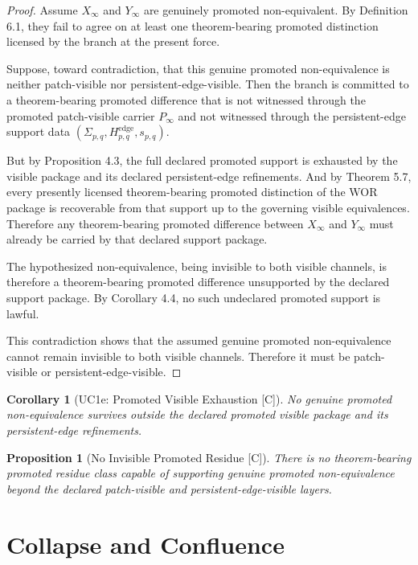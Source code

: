 \documentclass[11pt]{article}
\newtheorem{proposition}[theorem]{Proposition}
\newtheorem{corollary}[theorem]{Corollary}
\theoremstyle{definition}
\theoremstyle{remark}
\newcommand{\C}{\textnormal{[C]}}
\newcommand{\Pinf}{P_\infty}
\newcommand{\Xinf}{X_\infty}
\newcommand{\Sigmaedge}{\Sigma_{p,q}}
\newcommand{\Hedge}{H^{\mathrm{edge}}_{p,q}}
\newcommand{\scopepq}{s_{p,q}}
\begin{document}
\begin{proof}
Assume \(\Xinf\) and \(Y_\infty\) are genuinely promoted non-equivalent. By Definition 6.1, they fail to agree on at least one theorem-bearing promoted distinction licensed by the branch at the present force.

Suppose, toward contradiction, that this genuine promoted non-equivalence is neither patch-visible nor persistent-edge-visible. Then the branch is committed to a theorem-bearing promoted difference that is not witnessed through the promoted patch-visible carrier \(\Pinf\) and not witnessed through the persistent-edge support data \((\Sigmaedge,\Hedge,\scopepq)\).

But by Proposition 4.3, the full declared promoted support is exhausted by the visible package and its declared persistent-edge refinements. And by Theorem 5.7, every presently licensed theorem-bearing promoted distinction of the WOR package is recoverable from that support up to the governing visible equivalences. Therefore any theorem-bearing promoted difference between \(\Xinf\) and \(Y_\infty\) must already be carried by that declared support package.

The hypothesized non-equivalence, being invisible to both visible channels, is therefore a theorem-bearing promoted difference unsupported by the declared support package. By Corollary 4.4, no such undeclared promoted support is lawful.

This contradiction shows that the assumed genuine promoted non-equivalence cannot remain invisible to both visible channels. Therefore it must be patch-visible or persistent-edge-visible. \qedhere
\end{proof}

\begin{corollary}[UC1e: Promoted Visible Exhaustion {\C}]
No genuine promoted non-equivalence survives outside the declared promoted visible package and its persistent-edge refinements.
\end{corollary}

\begin{proposition}[No Invisible Promoted Residue {\C}]
There is no theorem-bearing promoted residue class capable of supporting genuine promoted non-equivalence beyond the declared patch-visible and persistent-edge-visible layers.
\end{proposition}

\section{Collapse and Confluence}
\end{document}
